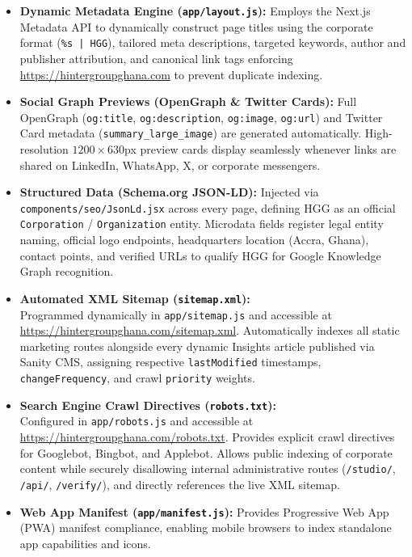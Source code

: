 \documentclass[11pt,a4paper,oneside]{book}
\begin{document}
\begin{itemize}[leftmargin=1.2cm]
  \item \textbf{Dynamic Metadata Engine (\texttt{app/layout.js}):} Employs the Next.js Metadata API to dynamically construct page titles using the corporate format (\texttt{\%s | HGG}), tailored meta descriptions, targeted keywords, author and publisher attribution, and canonical link tags enforcing \url{https://hintergroupghana.com} to prevent duplicate indexing.
  \item \textbf{Social Graph Previews (OpenGraph \& Twitter Cards):} Full OpenGraph (\texttt{og:title}, \texttt{og:description}, \texttt{og:image}, \texttt{og:url}) and Twitter Card metadata (\texttt{summary\_large\_image}) are generated automatically. High-resolution $1200\times630$px preview cards display seamlessly whenever links are shared on LinkedIn, WhatsApp, X, or corporate messengers.
  \item \textbf{Structured Data (Schema.org JSON-LD):} Injected via \texttt{components/seo/JsonLd.jsx} across every page, defining HGG as an official \texttt{Corporation} / \texttt{Organization} entity. Microdata fields register legal entity naming, official logo endpoints, headquarters location (Accra, Ghana), contact points, and verified URLs to qualify HGG for Google Knowledge Graph recognition.
  \item \textbf{Automated XML Sitemap (\texttt{sitemap.xml}):}\\
    Programmed dynamically in \texttt{app/sitemap.js} and accessible at \url{https://hintergroupghana.com/sitemap.xml}. Automatically indexes all static marketing routes alongside every dynamic Insights article published via Sanity CMS, assigning respective \texttt{lastModified} timestamps, \texttt{changeFrequency}, and crawl \texttt{priority} weights.
  \item \textbf{Search Engine Crawl Directives (\texttt{robots.txt}):}\\
    Configured in \texttt{app/robots.js} and accessible at \url{https://hintergroupghana.com/robots.txt}. Provides explicit crawl directives for Googlebot, Bingbot, and Applebot. Allows public indexing of corporate content while securely disallowing internal administrative routes (\texttt{/studio/}, \texttt{/api/}, \texttt{/verify/}), and directly references the live XML sitemap.
  \item \textbf{Web App Manifest (\texttt{app/manifest.js}):} Provides Progressive Web App (PWA) manifest compliance, enabling mobile browsers to index standalone app capabilities and icons.
\end{itemize}
\end{document}
